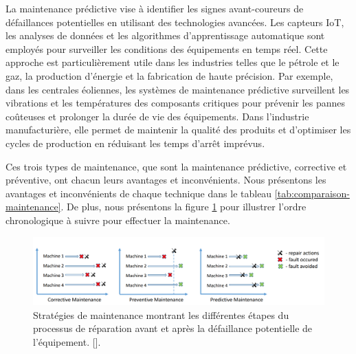 La maintenance prédictive vise à identifier les signes avant-coureurs de
défaillances potentielles en utilisant des technologies avancées. Les capteurs
IoT, les analyses de données et les algorithmes d'apprentissage automatique
sont employés pour surveiller les conditions des équipements en temps réel.
Cette approche est particulièrement utile dans les industries telles que le
pétrole et le gaz, la production d'énergie et la fabrication de haute
précision. Par exemple, dans les centrales éoliennes, les systèmes de
maintenance prédictive surveillent les vibrations et les températures des
composants critiques pour prévenir les pannes coûteuses et prolonger la durée
de vie des équipements. Dans l'industrie manufacturière, elle permet de
maintenir la qualité des produits et d'optimiser les cycles de production en
réduisant les temps d'arrêt imprévus.

Ces trois types de maintenance, que sont la maintenance prédictive, corrective
et préventive, ont chacun leurs avantages et inconvénients. Nous présentons les
avantages et inconvénients de chaque technique dans le tableau
\ref{tab:comparaison-maintenance}. De plus, nous présentons la figure
\ref{fig:pred} pour illustrer l'ordre chronologique à suivre pour effectuer la
maintenance.

\begin{figure}[hbt!]
	\centering
	\includegraphics[width=18cm]{images_pfe/predictive.png}
	\caption{Stratégies de maintenance montrant les différentes étapes du processus de réparation avant et après la défaillance potentielle de l'équipement. [\cite{Mrozek2023}].}
	\label{fig:pred}
\end{figure}
\FloatBarrier

